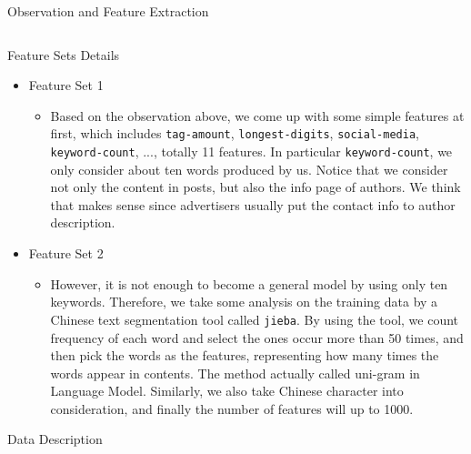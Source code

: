 \documentclass[final,hyperref={pdfpagelabels=false}]{beamer}
\begin{document}
\begin{frame}[t]
\begin{columns}[t]
\begin{column}{.465\textwidth}
\begin{block}{Observation and Feature Extraction}
\begin{tabular}{ll}
\end{tabular}

\end{block}



\begin{block}{Feature Sets Details}


\begin{itemize}
\item Feature Set 1
	\begin{itemize}
		\item Based on the observation above, we come up with some simple features at first, which includes \texttt{tag-amount}, \texttt{longest-digits}, \texttt{social-media}, \texttt{keyword-count}, ..., totally 11 features. In particular \texttt{keyword-count}, we only consider about ten words produced by us. Notice that we consider not only the content in posts, but also the info page of authors. We think that makes sense since advertisers usually put the contact info to author description. 
	\end{itemize}
\item Feature Set 2
	\begin{itemize}
		\item However, it is not enough to become a general model by using only ten keywords. Therefore, we take some analysis on the training data by a Chinese text segmentation tool called \texttt{jieba}. By using the tool, we count frequency of each word and select the ones occur more than 50 times, and then pick the words as the features, representing how many times the words appear in contents. The method actually called uni-gram in Language Model. Similarly, we also take Chinese character into consideration, and finally the number of features will up to 1000.
	\end{itemize}
\end{itemize}
\end{block}




\begin{block}{Data Description}


\end{block}
\end{column}
\end{columns}
\end{frame}
\end{document}
